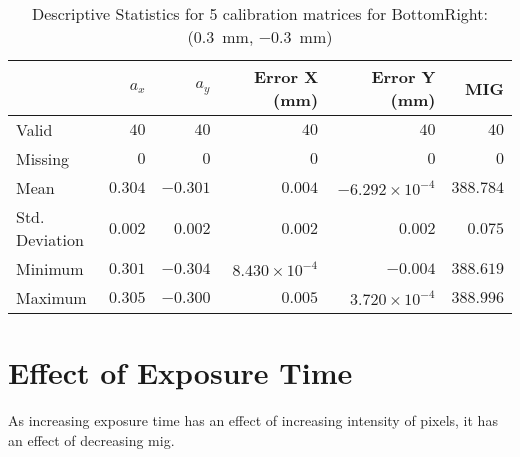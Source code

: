 \begin{table}[h]
    \begin{subtable}{\textwidth}
        \centering
        \footnotesize
        \begin{tabular}{lrrrrr}
            \toprule
                & $a_x$ & $a_y$ & Error X (mm) & Error Y (mm) & MIG  \\
            \midrule
			Valid & $40$ & $40$ & $40$ & $40$ & $40$  \\
			Missing & $0$ & $0$ & $0$ & $0$ & $0$  \\
			Mean & $0.304$ & $-0.301$ & $0.004$ & $-6.292\times10^{-4}$ & $388.784$  \\
			Std. Deviation & $0.002$ & $0.002$ & $0.002$ & $0.002$ & $0.075$  \\
			Minimum & $0.301$ & $-0.304$ & $8.430\times10^{-4}$ & $-0.004$ & $388.619$  \\
			Maximum & $0.305$ & $-0.300$ & $0.005$ & $3.720\times10^{-4}$ & $388.996$  \\
            \bottomrule
        \end{tabular}
        \caption{$T_{Avg}$}
        \end{subtable}

    \caption{Descriptive Statistics for 5 calibration matrices for \textsf{BottomRight:} (\SI{0.3}{\milli\meter}, \SI{-0.3}{\milli\meter})}
    \label{table:stats_matrix_bottomright}
\end{table}

\clearpage

\section{Effect of Exposure Time}
As increasing exposure time has an effect of increasing intensity of pixels, it has an effect of decreasing \gls{mig}. 

